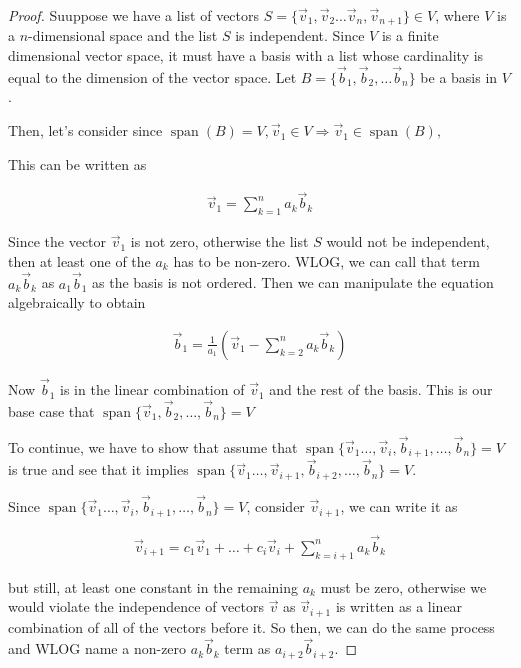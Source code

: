 \documentclass{article}
\DeclareMathOperator{\spn}{span}
\begin{document}
\begin{proof}
Suuppose we have a list of vectors $S = \{\vec{v}_1, \vec{v}_2 \ldots \vec{v}_n, \vec{v}_{n+1} \} \in V$, where $V$ is a $n$-dimensional space and the list $S$ is independent. Since $V$ is a finite dimensional vector space, it must have a basis with a list whose cardinality is equal to the dimension of the vector space. Let $B = \{ \vec{b}_1, \vec{b}_2 ,\ldots \vec{b}_n \}$ be a basis in $V$.

Then, let's consider since $\spn(B) = V, \vec{v}_1 \in V \Rightarrow \vec{v}_1 \in \spn(B), $

This can be written as 

\begin{align*}
\vec{v}_1 = \sum_{k=1}^{n} a_k \vec{b}_k
\end{align*}

Since the vector $\vec{v}_1$ is not zero, otherwise the list $S$ would not be independent, then at least one of the $a_k$ has to be non-zero. WLOG, we can call that term $a_k \vec{b}_k$ as $a_1 \vec{b}_1$ as the basis is not ordered. Then we can manipulate the equation algebraically to obtain

\begin{align*}
\vec{b}_1 = \frac{1}{a_1}(\vec{v}_1 - \sum_{k=2}^{n} a_k \vec{b}_k)
\end{align*}

Now $\vec{b}_1$ is in the linear combination of $\vec{v}_1$ and the rest of the basis. This is our base case that $\spn{\{\vec{v}_1, \vec{b}_2 ,\ldots , \vec{b}_n\}} = V$

To continue, we have to show that assume that $\spn{\{ \vec{v}_1 \ldots, \vec{v}_i , \vec{b}_{i+1}, \ldots, \vec{b}_n \}}=V$ is true and see that it implies $\spn{\{ \vec{v}_1 \ldots, \vec{v}_{i+1} , \vec{b}_{i+2}, \ldots, \vec{b}_n \}}=V$.

Since $\spn{\{ \vec{v}_1 \ldots, \vec{v}_i , \vec{b}_{i+1}, \ldots, \vec{b}_n \}}=V$, consider $\vec{v}_{i+1}$, we can write it as

\begin{align*}
\vec{v}_{i+1} = c_1 \vec{v}_1 + \ldots + c_i \vec{v}_{i} + \sum_{k=i+1}^{n} a_k \vec{b}_k
\end{align*}

but still, at least one constant in the remaining $a_k$ must be zero, otherwise we would violate the independence of vectors $\vec{v}$ as $\vec{v}_{i+1}$ is written as a linear combination of all of the vectors before it. So then, we can do the same process and WLOG name a non-zero $a_k \vec{b}_k$ term as $a_{i+2} \vec{b}_{i+2}$.


\end{proof}
\end{document}
